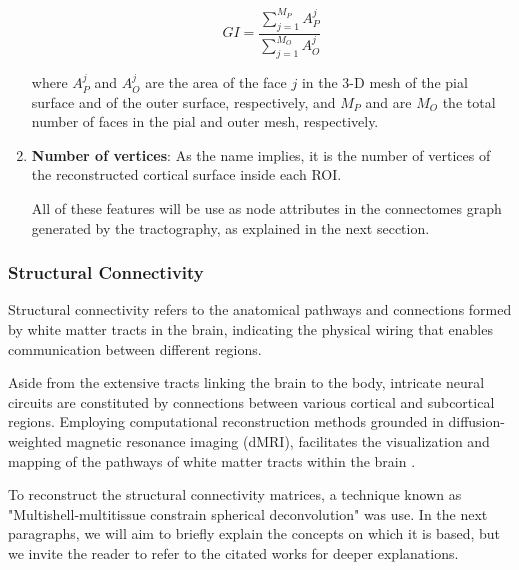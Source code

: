 \documentclass{cys}
\begin{document}
\begin{enumerate}
\begin{equation}
GI=\frac{\sum_{j=1}^{M_P}A_P^j}{\sum_{j=1}^{M_O}A_O^j}
\end{equation}

where $A_P^j$ and $A_O^j$ are the area of the face $j$ in the 3-D mesh
of the pial surface and of the outer surface, respectively, and $M_P$ and are $M_O$ the total number of faces in the pial and outer mesh, respectively.
\\
\item \textbf{Number of vertices}: As the name implies, it is the number of vertices of the reconstructed cortical surface inside each ROI.

\bigskip
All of these features will be use as node attributes in the connectomes graph generated by the tractography, as explained in the next secction. 

\end{enumerate}

\bigskip

\bigskip

\subsubsection{Structural Connectivity}

Structural connectivity refers to the anatomical pathways and connections formed by white matter tracts in the brain, indicating the physical wiring that enables communication between different regions.

\bigskip
Aside from the extensive tracts linking the brain to the body, intricate neural circuits are constituted by connections between various cortical and subcortical regions. Employing computational reconstruction methods grounded in diffusion-weighted magnetic resonance imaging (dMRI), facilitates the visualization and mapping of the pathways of white matter tracts within the brain \cite{maier2017challenge}.

\bigskip
To reconstruct the structural connectivity matrices, a technique known as "Multishell-multitissue constrain spherical deconvolution" was use. In the next paragraphs, we will aim to briefly explain the concepts on which it is based, but we invite the reader to refer to the citated works for deeper explanations.
\end{document}
